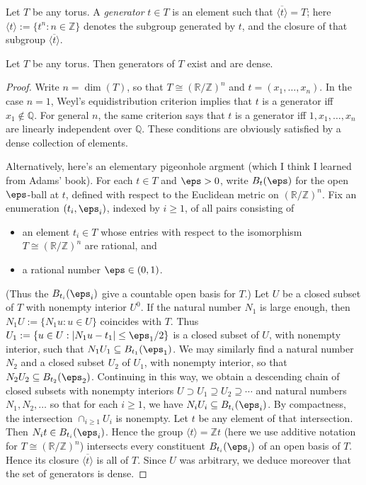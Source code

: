 \documentclass[reqno]{amsart} 
\begin{document}
\begin{definition}
  Let $T$ be any torus.  A \emph{generator} $t \in T$ is an element such that $\overline{\langle t \rangle} = T$; here $\langle t \rangle := \{t^n : n \in \mathbb{Z} \}$ denotes the subgroup generated by $t$, and the closure of that subgroup $\overline{\langle t \rangle}$.
\end{definition}
\begin{lemma}\label{lem:generators-exist}
  Let $T$ be any torus.  Then generators of $T$ exist and are dense.
\end{lemma}
\begin{proof}
  Write $n = \dim(T)$, so that $T \cong (\mathbb{R}/\mathbb{Z})^n$ and $t = (x_1,\dotsc,x_n)$.  In the case $n=1$, Weyl's equidistribution criterion implies that $t$ is a generator iff $x_1 \notin \mathbb{Q}$.  For general $n$, the same criterion says that $t$ is a generator iff $1,x_1,\dotsc,x_n$ are linearly independent over $\mathbb{Q}$.  These conditions are obviously satisfied by a dense collection of elements.

  Alternatively, here's an elementary pigeonhole argment (which I think I learned from Adams' book).  For each $t \in T$ and $\eps > 0$, write $B_t(\eps)$ for the open $\eps$-ball at $t$, defined with respect to the Euclidean metric on $(\mathbb{R}/\mathbb{Z})^n$.  Fix an enumeration $(t_i,\eps_i)$, indexed by $i \geq 1$, of all pairs consisting of
  \begin{itemize}
  \item an element $t_i \in T$ whose entries with respect to the isomorphism $T \cong (\mathbb{R}/\mathbb{Z})^n$ are rational, and
  \item a rational number $\eps \in (0,1)$.
  \end{itemize}
  (Thus the $B_{t_i}(\eps_i)$ give a countable open basis for $T$.)  Let $U$ be a closed subset of $T$ with nonempty interior $U^0$.  If the natural number $N_1$ is large enough, then $N_1 U := \{N_1 u : u \in U\}$ coincides with $T$.  Thus $U_1 := \{u \in U : |N_1 u - t_1| \leq \eps_1/2 \}$ is a closed subset of $U$, with nonempty interior, such that $N_1 U_1 \subseteq B_{t_1}(\eps_1)$.  We may similarly find a natural number $N_2$ and a closed subset $U_2$ of $U_1$, with nonempty interior, so that $N_2 U_2 \subseteq B_{t_2}(\eps_2)$.  Continuing in this way, we obtain a descending chain of closed subsets with nonempty interiors $U \supset U_1 \supseteq U_2 \supseteq \dotsb$ and natural numbers $N_1, N_2, \dotsc$ so that for each $i \geq 1$, we have $N_i U_i \subseteq B_{t_i}(\eps_i)$.  By compactness, the intersection $\cap_{i \geq 1} U_i$ is nonempty.  Let $t$ be any element of that intersection.  Then $N_i t \in B_{t_i}(\eps_i)$.  Hence the group $\langle t \rangle = \mathbb{Z} t$ (here we use additive notation for $T \cong (\mathbb{R}/\mathbb{Z})^n$) intersects every constituent $B_{t_i}(\eps_i)$ of an open basis of $T$.  Hence its closure $\overline{\langle t \rangle }$ is all of $T$.  Since $U$ was arbitrary, we deduce moreover that the set of generators is dense.
\end{proof}
\end{document}
